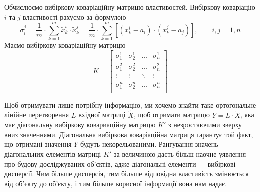 Обчислюємо вибіркову коваріаційну матрицю властивостей.
Вибіркову коваріацію $i$ та $j$ властивості рахуємо за формулою
\begin{equation*}
  \sigma_i^j
  = \frac{1}{m} \cdot \sum_{k=1}^{m} \tilde{x}_k^i \cdot \tilde{x}_k^j
  = \frac{1}{m} \cdot \sum_{k=1}^{m}
    \left[ \left( x_k^i - a_i \right) \cdot \left( x_k^j - a_j \right) \right],
    \qquad i,j = \overline{1,n}
\end{equation*}
Маємо вибіркову коваріаційну матрицю
\begin{equation*}
  K = \begin{bmatrix}
    \sigma_1^1 & \sigma_2^1 & \dots  & \sigma_n^1 \\
    \sigma_1^2 & \sigma_2^2 & \dots  & \sigma_n^2 \\
    \vdots     & \vdots     & \ddots & \vdots     \\
    \sigma_1^n & \sigma_2^n & \dots  & \sigma_n^n \\
  \end{bmatrix}
\end{equation*}

Щоб отримувати лише потрібну інформацію, ми хочемо знайти таке ортогональне
лінійне перетворення $L$ вхідної матриці $\tilde{X}$, щоб отримати матрицю
$Y = L \cdot \tilde{X}$, яка має діагональну вибіркову ковариаційну матрицю $K'$
з незростаючими зверху вниз значеннями.
Діагональна вибіркова коваріаційна матриця гарантує той факт, що отримані
значення $Y$ будуть некорельованими.
Рангування значень діагональних елементів матриці $K'$ за величиною дасть більш
наочне уявлення про будову досліджуваних об’єктів, адже діагональні
елементи --- вибіркові дисперсії.
Чим більше дисперсія, тим більше відповідна властивість змінюється від об’єкту
до об’єкту, і тим більше корисної інформації вона нам надає.

